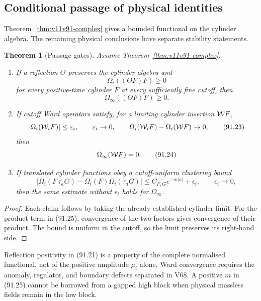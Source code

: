 \documentclass[11pt]{article}
\newtheorem{theorem}{Theorem}[section]
\begin{document}
\subsection{Conditional passage of physical identities}

Theorem~\ref{thm:v11v91-complex} gives a bounded functional on the
cylinder algebra.  The remaining physical conclusions have separate
stability statements.

\begin{theorem}[Passage gates]
\label{thm:v11v91-gates}
Assume Theorem~\ref{thm:v11v91-complex}.
\begin{enumerate}
\item If a reflection \(\Theta\) preserves the cylinder algebra and
\[
                       \Omega_i((\Theta F)F)\ge0             \tag{91.21}
\]
for every positive-time cylinder \(F\) at every sufficiently fine
cutoff, then
\[
                       \Omega_\infty((\Theta F)F)\ge0.       \tag{91.22}
\]
\item If cutoff Ward operators satisfy, for a limiting cylinder
      insertion \({\cal W}F\),
\[
 |\Omega_i({\cal W}_iF)|\le\varepsilon_i,\qquad
 \varepsilon_i\to0,\qquad
 \Omega_i({\cal W}_iF)-\Omega_i({\cal W}F)\to0,              \tag{91.23}
\]
then
\[
                              \Omega_\infty({\cal W}F)=0.    \tag{91.24}
\]
\item If translated cylinder functions obey a cutoff-uniform
      clustering bound
\[
 |\Omega_i(F\,\tau_aG)-\Omega_i(F)\Omega_i(\tau_aG)|
             \le C_{F,G}e^{-m|a|}+\epsilon_i,\qquad
             \epsilon_i\to0,                               \tag{91.25}
\]
then the same estimate without \(\epsilon_i\) holds for
\(\Omega_\infty\).
\end{enumerate}
\end{theorem}

\begin{proof}
Each claim follows by taking the already established cylinder limit.
For the product term in (91.25), convergence of the two factors gives
convergence of their product.  The bound is uniform in the cutoff, so
the limit preserves its right-hand side.
\end{proof}

Reflection positivity in (91.21) is a property of the complete
normalised functional, not of the positive amplitude \(\mu_i\) alone.
Ward convergence requires the anomaly, regulator, and boundary
defects separated in V68.  A positive \(m\) in (91.25) cannot be
borrowed from a gapped high block when physical massless fields remain
in the low block.
\end{document}
